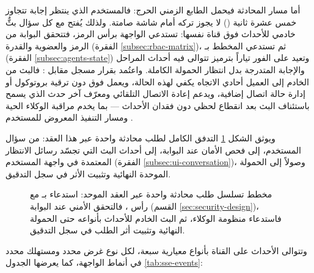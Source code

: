 أما مسار المحادثة فيحمل الطابع الزمني الحرج: فالمستخدم الذي ينتظر إجابة تتجاوز خمس عشرة ثانية () لا يجوز تركه أمام شاشة صامتة. ولذلك يُفتح مع كل سؤال بثٌّ خادمي للأحداث  فوق قناة  نفسها: تستدعي الواجهة  برأس الرمز، فتتحقق البوابة من الرمز والعضوية والقدرة (الفقرة \ref{subsec:rbac-matrix})، ثم تستدعي المخطط بـ (الفقرة \ref{subsec:agents-state}) وتعيد على الفور تياراً بترميز  تتوالى فيه أحداث المراحل والإجابة المتدرجة بدل انتظار الحمولة الكاملة. واعتُمد  بقرار مسجل مقابل : فالبث من الخادم إلى العميل أحادي الاتجاه يكفي لهذه الحالة، ويعمل فوق  دون ترقية بروتوكول أو إدارة حالة اتصال إضافية، ويدعم إعادة الاتصال التلقائي ومعرّف آخر حدث  الذي يسمح باستئناف البث بعد انقطاع لحظي دون فقدان الأحداث — بما يخدم مراقبة الوكلاء الحية  ومسار التنفيذ المعروض للمستخدم .

ويوثق الشكل \ref{fig:api-sse-sequence} التدفق الكامل لطلب محادثة واحدة عبر هذا العقد: من سؤال المستخدم، إلى فحص الأمان عند البوابة، إلى أحداث البث التي تجسّد رسائل الانتظار المعتمدة في واجهة المستخدم (الفقرة \ref{subsec:ui-conversation})، وصولاً إلى الحمولة الموحدة النهائية وتثبيت الأثر في سجل التدقيق.

\begin{figure}[H]
  \centering
  
  \caption{مخطط تسلسل طلب محادثة واحدة عبر العقد الموحد: استدعاء  بـ مع رأس ، فالتحقق الأمني عند البوابة (القسم \ref{sec:security-design})، فاستدعاء منظومة الوكلاء، ثم البث الخادم للأحداث  بأنواعه حتى الحمولة النهائية وتثبيت أثر الطلب في سجل التدقيق.}
  \label{fig:api-sse-sequence}
\end{figure}

وتتوالى الأحداث على القناة بأنواع معيارية سبعة، لكل نوع غرض محدد ومستهلك محدد في أنماط الواجهة، كما يعرضها الجدول \ref{tab:sse-events}:

